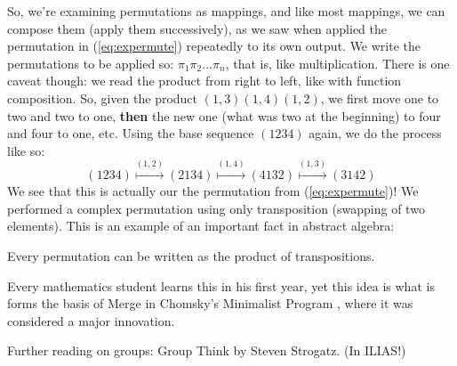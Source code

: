 \documentclass[a4paper,12pt,oneside,leqno]{scrartcl}%
\newcommand{\enquote}[1]{\frqq{}#1\flqq{}}
\begin{document}
So, we're examining permutations as mappings, and like most mappings, we can compose them (apply them successively), as we saw when applied the permutation in (\ref{eq:expermute}) repeatedly to its own output. We write the permutations to be applied so: $\pi_{1}\pi_{2}\ldots\pi_{n}$, that is, like multiplication.  There is one caveat though: we read the product from right to left, like with function composition.  So, given the product $(1,3)(1,4)(1,2)$, we first move one to two and two to one, \textbf{then} the new one (what was two at the beginning) to four and four to one, etc. 
Using the base sequence $(1 2 3 4)$ again, we do the process like so:
\begin{equation}
(1 2 3 4) \overset{(1,2)}{\mapsto} (2 1 3 4) \overset{(1,4)}{\mapsto} (4 1 3 2) \overset{(1,3)}{\mapsto} (3 1 4 2)
\end{equation}
We see that this is actually our the permutation from (\ref{eq:expermute})!  We performed a complex permutation using only transposition (swapping of two elements). This is an example of an important fact in abstract algebra:
\begin{thm}
Every permutation can be written as the product of transpositions.
\end{thm}
Every mathematics student learns this in his first year, yet this idea is what is forms the basis of Merge in Chomsky's Minimalist Program \citep{chomsky1995a}, where it was considered a major innovation.

\vspace{20pt}
Further reading on groups: 
\enquote{Group Think} by Steven Strogatz.\citep{strogatz2010b}  (In ILIAS!)



\end{document}
